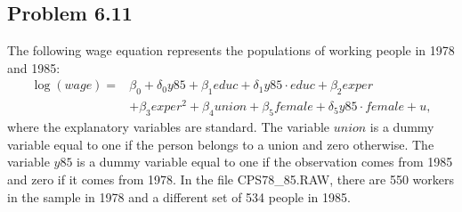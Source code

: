 \documentclass[10pt]{article}
\begin{document}
\subsection*{Problem 6.11}
The following wage equation represents the populations of working people in 1978 and 1985:
\begin{align*}
    \log(wage)=&\beta_0+ \delta_0 y85+\beta_1 educ+\delta_1 y85\cdot educ + \beta_2 exper \\
    &+\beta_3 exper^2 + \beta_4 union +\beta_5 female +\delta_5 y85\cdot female+u,
\end{align*}
where the explanatory variables are standard. The variable $union$ is a dummy variable equal to one if the person belongs to a union and zero otherwise. The variable $y85$ is a dummy variable equal to one if the observation comes from 1985 and zero if it comes from 1978. In the file CPS78\_85.RAW, there are 550 workers in the sample in 1978 and a different set of 534 people in 1985. 
\end{document}

